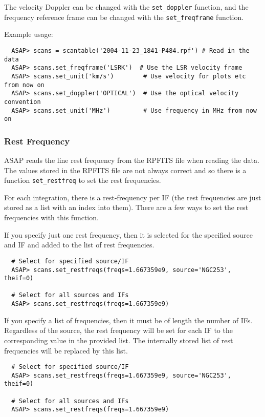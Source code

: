 \documentclass[11pt]{article}
\newcommand{\cmd}[1]{{\tt #1}}
\begin{document}
The velocity Doppler can be changed with the \cmd{set\_doppler}
function, and the frequency reference frame can be changed with the 
\cmd{set\_freqframe} function.

Example usage:

\begin{verbatim}
  ASAP> scans = scantable('2004-11-23_1841-P484.rpf') # Read in the data
  ASAP> scans.set_freqframe('LSRK')  # Use the LSR velocity frame
  ASAP> scans.set_unit('km/s')        # Use velocity for plots etc from now on
  ASAP> scans.set_doppler('OPTICAL')  # Use the optical velocity convention
  ASAP> scans.set_unit('MHz')         # Use frequency in MHz from now on
\end{verbatim}


\subsubsection{Rest Frequency}

ASAP reads the line rest frequency from the RPFITS file when reading
the data. The values stored in the RPFITS file are not always correct
and so there is a function \cmd{set\_restfreq} to set the rest frequencies.

For each integration, there is a rest-frequency per IF (the rest
frequencies are just stored as a list with an index into them).
There are a few ways to set the rest frequencies with this function.

If you specify just one rest frequency, then it is selected for the
specified source and IF and added to the list of rest frequencies.

\begin{verbatim}
  # Select for specified source/IF
  ASAP> scans.set_restfreqs(freqs=1.667359e9, source='NGC253', theif=0)   

  # Select for all sources and IFs
  ASAP> scans.set_restfreqs(freqs=1.667359e9)                             
\end{verbatim}


If you specify a list of frequencies, then it must be of length the
number of IFs.  Regardless of the source, the rest frequency will be set
for each IF to the corresponding value in the provided list.  The
internally stored list of rest frequencies will be replaced by this
list.


\begin{verbatim}
  # Select for specified source/IF
  ASAP> scans.set_restfreqs(freqs=1.667359e9, source='NGC253', theif=0)   

  # Select for all sources and IFs
  ASAP> scans.set_restfreqs(freqs=1.667359e9)                             
\end{verbatim}
\end{document}
